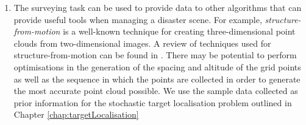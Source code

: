 \begin{enumerate}
    \item The surveying task can be used to provide data to other algorithms that can provide useful tools when managing a disaster scene. For example, \textit{structure-from-motion} is a well-known technique for creating three-dimensional point clouds from two-dimensional images. A review of techniques used for structure-from-motion can be found in \cite{Bianco2018EvaluatingPipelines}. There may be potential to perform optimisations in the generation of the spacing and altitude of the grid points as well as the sequence in which the points are collected in order to generate the most accurate point cloud possible. We use the sample data collected as prior information for the stochastic target localisation problem outlined in Chapter \ref{chap:targetLocalisation}
    
    
\end{enumerate}

























